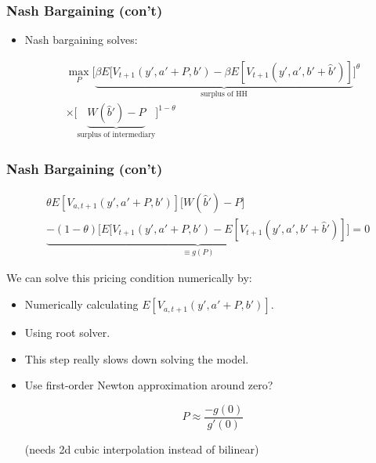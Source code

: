 \documentclass{beamer}
\begin{document}
\begin{frame}
\frametitle{Nash Bargaining (con't)}

\begin{itemize}[<+->]

\item Nash bargaining solves:

\begin{align*}
\max_{P} \Bigg[\underbrace{\beta E[V_{t+1}(y', a' + P, b') - \beta E[V_{t+1}(y', a', b' + \hat{b}')]}_{\text{surplus of HH}}\Bigg]^\theta \\
\times \Bigg[\underbrace{ W(\hat{b}') - P}_{\text{surplus of intermediary}}\Bigg]^{1-\theta}
\end{align*}

\hyperlink{nb_foc}{ }

\end{itemize}

\end{frame}



\begin{frame}
\frametitle{Nash Bargaining (con't)}

\begin{align*}
&\theta E[V_{a,t+1}(y', a' + P, b')] \Bigg[ W(\hat{b}') - P\Bigg]\\
&\underbrace{- (1-\theta)\Bigg[ E[V_{t+1}(y', a' + P, b') - E[V_{t+1}(y', a', b' + \hat{b}')]\Bigg]}_{\equiv g(P)} = 0
\end{align*}

\bigskip

We can solve this pricing condition numerically by:

\begin{itemize}[<+->]
\item Numerically calculating $E[V_{a,t+1}(y', a' + P, b')]$.
\item Using root solver.
\item This step really slows down solving the model. 
\item Use first-order Newton approximation around zero?

$$
P \approx \frac{-g(0)}{g'(0)}
$$

(needs 2d cubic interpolation instead of bilinear)
 
\end{itemize}

\end{frame}
\end{document}
